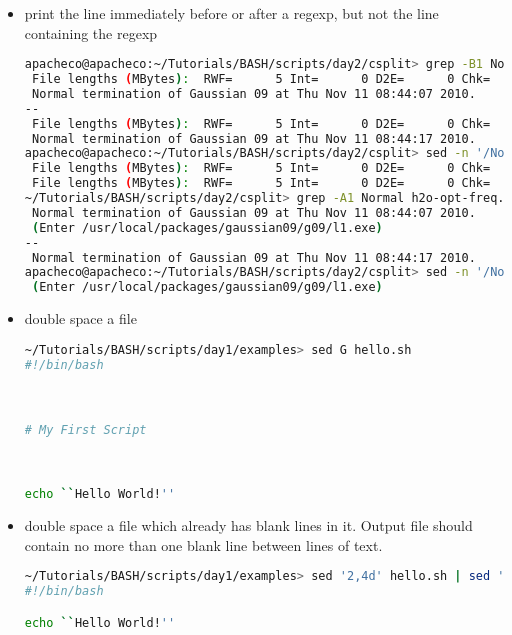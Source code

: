 \documentclass[slidestop,mathserif,compress,xcolor=svgnames]{beamer}
\begin{document}
\begin{frame}
{\begin{itemize}
\begin{lstlisting}[language=bash]
      \end{lstlisting}
      \framebreak
    \item print the line immediately before or after a regexp, but not the line containing the regexp
      \begin{lstlisting}[language=bash]
apacheco@apacheco:~/Tutorials/BASH/scripts/day2/csplit> grep -B1 Normal h2o-opt-freq.log
 File lengths (MBytes):  RWF=      5 Int=      0 D2E=      0 Chk=      1 Scr=      1
 Normal termination of Gaussian 09 at Thu Nov 11 08:44:07 2010.
--
 File lengths (MBytes):  RWF=      5 Int=      0 D2E=      0 Chk=      1 Scr=      1
 Normal termination of Gaussian 09 at Thu Nov 11 08:44:17 2010.
apacheco@apacheco:~/Tutorials/BASH/scripts/day2/csplit> sed -n '/Normal/{g;1!p;};h' h2o-opt-freq.log 
 File lengths (MBytes):  RWF=      5 Int=      0 D2E=      0 Chk=      1 Scr=      1
 File lengths (MBytes):  RWF=      5 Int=      0 D2E=      0 Chk=      1 Scr=      1
~/Tutorials/BASH/scripts/day2/csplit> grep -A1 Normal h2o-opt-freq.log
 Normal termination of Gaussian 09 at Thu Nov 11 08:44:07 2010.
 (Enter /usr/local/packages/gaussian09/g09/l1.exe)
--
 Normal termination of Gaussian 09 at Thu Nov 11 08:44:17 2010.
apacheco@apacheco:~/Tutorials/BASH/scripts/day2/csplit> sed -n '/Normal/{n;p;}' h2o-opt-freq.log 
 (Enter /usr/local/packages/gaussian09/g09/l1.exe)
      \end{lstlisting}
      \item double space a file
        \begin{lstlisting}[language=bash]
~/Tutorials/BASH/scripts/day1/examples> sed G hello.sh 
#!/bin/bash



# My First Script



echo ``Hello World!''

        \end{lstlisting}
      \item double space a file which already has blank lines in it. Output file should contain no more than one blank line between lines of text.
        \begin{lstlisting}[language=bash]
~/Tutorials/BASH/scripts/day1/examples> sed '2,4d' hello.sh | sed '/^$/d;G'
#!/bin/bash

echo ``Hello World!''


\end{lstlisting}
\end{itemize}}
\end{frame}
\end{document}
